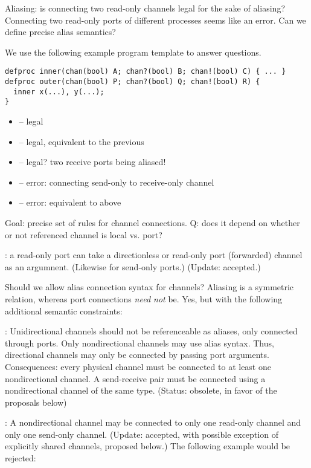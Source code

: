 Aliasing: is connecting two read-only channels legal for the sake of aliasing?
Connecting two read-only ports of different processes seems like an error.
Can we define precise alias semantics?

We use the following example program template to answer questions.  

\begin{verbatim}
defproc inner(chan(bool) A; chan?(bool) B; chan!(bool) C) { ... }
defproc outer(chan(bool) P; chan?(bool) Q; chan!(bool) R) {
  inner x(...), y(...);
}
\end{verbatim}

\begin{itemize}
\item {} -- legal
\item {} -- legal, equivalent to the previous
\item {} -- legal?  two receive ports being aliased!
\item {} -- error: connecting send-only to receive-only channel
\item {} -- error: equivalent to above
\end{itemize}

Goal: precise set of rules for channel connections.
Q: does it depend on whether or not referenced channel is local vs. port?

: a read-only port can take a directionless or 
read-only port (forwarded) channel as an argumnent.  
(Likewise for send-only ports.)  
(Update: accepted.)

Should we allow alias connection syntax for channels?
Aliasing is a symmetric relation, whereas port connections \emph{need not} be.  
Yes, but with the following additional semantic constraints:

:
Unidirectional channels should not be referenceable as aliases, only
connected through ports.  
Only nondirectional channels may use alias syntax.  
Thus, directional channels may only be connected by passing port arguments.  
Consequences: every physical channel must be connected to at least one
nondirectional channel.  
A send-receive pair must be connected using a nondirectional channel
of the same type.  
(Status: obsolete, in favor of the proposals below)

:
A nondirectional channel may be connected to only one read-only channel
and only one send-only channel.  
(Update: accepted, with possible exception of explicitly shared channels, 
proposed below.)
The following example would be rejected:


